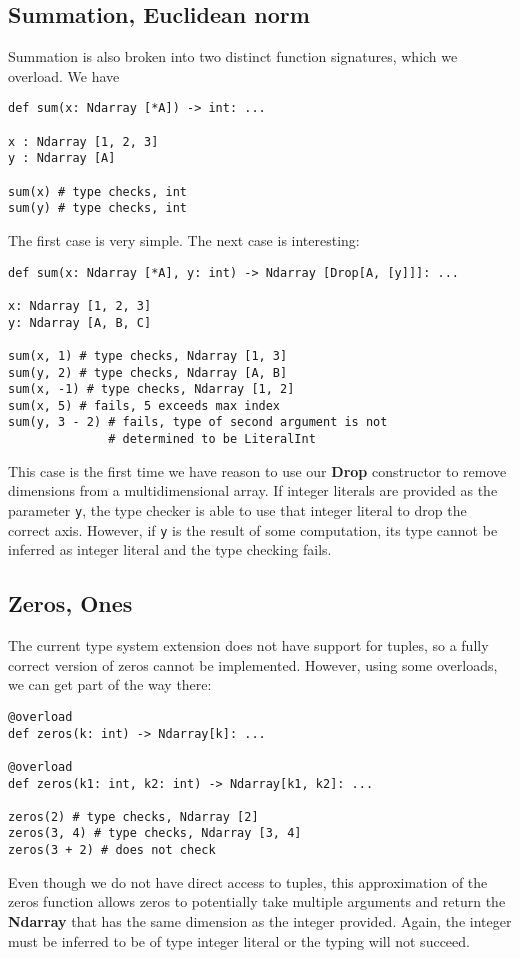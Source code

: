 \documentclass{report}
\begin{document}
\subsection{Summation, Euclidean norm}
Summation is also broken into two distinct function signatures, which we overload. We have

\begin{singlespace*}
    \begin{verbatim}
def sum(x: Ndarray [*A]) -> int: ...

x : Ndarray [1, 2, 3]
y : Ndarray [A]

sum(x) # type checks, int
sum(y) # type checks, int \end{verbatim}
\end{singlespace*}
The first case is very simple. The next case is interesting:

\begin{singlespace*}
    \begin{verbatim}
def sum(x: Ndarray [*A], y: int) -> Ndarray [Drop[A, [y]]]: ...

x: Ndarray [1, 2, 3]
y: Ndarray [A, B, C]

sum(x, 1) # type checks, Ndarray [1, 3]
sum(y, 2) # type checks, Ndarray [A, B]
sum(x, -1) # type checks, Ndarray [1, 2]
sum(x, 5) # fails, 5 exceeds max index
sum(y, 3 - 2) # fails, type of second argument is not
              # determined to be LiteralInt \end{verbatim}
\end{singlespace*}
This case is the first time we have reason to use our \textbf{Drop} constructor to remove dimensions from a multidimensional array. If integer literals are provided as the parameter \texttt{y}, the type checker is able to use that integer literal to drop the correct axis. However, if \texttt{y} is the result of some computation, its type cannot be inferred as integer literal and the type checking fails.

\subsection{Zeros, Ones}
The current type system extension does not have support for tuples, so a fully correct version of zeros cannot be implemented. However, using some overloads, we can get part of the way there:

\begin{singlespace*}
    \begin{verbatim}
@overload
def zeros(k: int) -> Ndarray[k]: ...

@overload
def zeros(k1: int, k2: int) -> Ndarray[k1, k2]: ...

zeros(2) # type checks, Ndarray [2]
zeros(3, 4) # type checks, Ndarray [3, 4]
zeros(3 + 2) # does not check\end{verbatim}
\end{singlespace*}
Even though we do not have direct access to tuples, this approximation of the zeros function allows zeros to potentially take multiple arguments and return the \textbf{Ndarray} that has the same dimension as the integer provided. Again, the integer must be inferred to be of type integer literal or the typing will not succeed.
\end{document}
